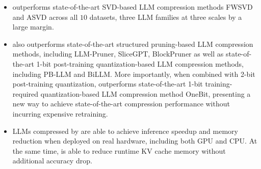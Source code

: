\vspace{-2mm}
\begin{itemize}
    \item \sysname outperforms state-of-the-art SVD-based LLM compression methods FWSVD and ASVD across all $10$ datasets, three LLM families at three scales by a large margin.
    \item  \sysname also outperforms state-of-the-art structured pruning-based LLM compression methods, including LLM-Pruner, SliceGPT, BlockPruner as well as state-of-the-art 1-bit post-training quantization-based LLM compression methods, including PB-LLM and BiLLM. More importantly, when combined with 2-bit post-training quantization, \sysname outperforms state-of-the-art 1-bit training-required quantization-based LLM compression method OneBit, presenting a new way to achieve state-of-the-art compression performance without incurring expensive retraining.
    \item LLMs compressed by \sysname are able to achieve inference speedup and memory reduction when deployed on real hardware, including both GPU and CPU. 
    At the same time, \sysname is able to reduce runtime KV cache memory without additional accuracy drop.
\end{itemize}


